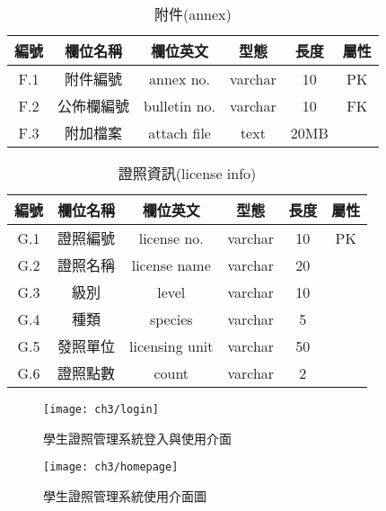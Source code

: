 \begin{table}[H]
\caption{附件(annex)}
\label{tab:附件}
\renewcommand{\arraystretch}{1} %
\arrayrulewidth=0.5pt               %
\centering
\begin{tabular}[t]{|c|c|c|c|c|c|}  %
\hline
編號 & 欄位名稱 & 欄位英文 & 型態 & 長度 & 屬性 \\
\hline
F.1 & 附件編號 & annex no. & varchar & 10 & PK \\
\hline
F.2 & 公佈欄編號 & bulletin no. & varchar & 10 & FK \\
\hline
F.3 & 附加檔案 & attach file & text & 20MB &  \\
\hline
\end{tabular}
\end{table}

\begin{table}[H]
\caption{證照資訊(license info)}
\label{tab:證照資訊}
\renewcommand{\arraystretch}{1} %
\arrayrulewidth=0.5pt               %
\centering
\begin{tabular}[t]{|c|c|c|c|c|c|}  %
\hline
編號 & 欄位名稱 & 欄位英文 & 型態 & 長度 & 屬性 \\
\hline
G.1 & 證照編號 & license no. & varchar & 10 & PK \\
\hline
G.2 & 證照名稱 & license name & varchar & 20 &  \\
\hline
G.3 & 級別 & level & varchar & 10 & \\
\hline
G.4 & 種類 & species & varchar & 5 & \\
\hline
G.5 & 發照單位 & licensing unit & varchar & 50 & \\
\hline
G.6 & 證照點數 & count & varchar & 2 & \\
\hline
\end{tabular}
\end{table}

\begin{figure}[h]
\centering \texttt{[image: ch3/login]}
\caption{\label{fig:login}學生證照管理系統登入與使用介面}
\end{figure}

\begin{figure}[h]
\centering \texttt{[image: ch3/homepage]}
\caption{\label{fig:homepage}學生證照管理系統使用介面圖}
\end{figure}

